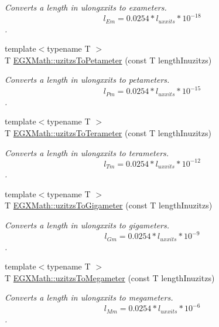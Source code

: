 \begin{DoxyCompactItemize}
\begin{DoxyCompactList}\small\item\em Converts a length in ulongxxits to exameters. \[ l_{Em}=0.0254 * l_{uxxits} * 10^{-18} \]. \end{DoxyCompactList}\item 
{\footnotesize template$<$typename T $>$ }\\T \mbox{\hyperlink{group___e_g_x_math-_conversions-_length_conversions-_imperial-uzitzs-_s_i_gafe93d0226789fd78c2ffa4223eb6af7b}{E\+G\+X\+Math\+::uzitzs\+To\+Petameter}} (const T length\+Inuzitzs)
\begin{DoxyCompactList}\small\item\em Converts a length in ulongxxits to petameters. \[ l_{Pm}=0.0254 * l_{uxxits} * 10^{-15} \]. \end{DoxyCompactList}\item 
{\footnotesize template$<$typename T $>$ }\\T \mbox{\hyperlink{group___e_g_x_math-_conversions-_length_conversions-_imperial-uzitzs-_s_i_gaed1a457a06ea3b69a4c63414b08b03a3}{E\+G\+X\+Math\+::uzitzs\+To\+Terameter}} (const T length\+Inuzitzs)
\begin{DoxyCompactList}\small\item\em Converts a length in ulongxxits to terameters. \[ l_{Tm}=0.0254 * l_{uxxits} * 10^{-12} \]. \end{DoxyCompactList}\item 
{\footnotesize template$<$typename T $>$ }\\T \mbox{\hyperlink{group___e_g_x_math-_conversions-_length_conversions-_imperial-uzitzs-_s_i_ga15833fbe62cb7d741b808bc63a21df55}{E\+G\+X\+Math\+::uzitzs\+To\+Gigameter}} (const T length\+Inuzitzs)
\begin{DoxyCompactList}\small\item\em Converts a length in ulongxxits to gigameters. \[ l_{Gm}=0.0254 * l_{uxxits} * 10^{-9} \]. \end{DoxyCompactList}\item 
{\footnotesize template$<$typename T $>$ }\\T \mbox{\hyperlink{group___e_g_x_math-_conversions-_length_conversions-_imperial-uzitzs-_s_i_ga237ffeef9137de3dd2cf5ae0eacf973e}{E\+G\+X\+Math\+::uzitzs\+To\+Megameter}} (const T length\+Inuzitzs)
\begin{DoxyCompactList}\small\item\em Converts a length in ulongxxits to megameters. \[ l_{Mm}=0.0254 * l_{uxxits} * 10^{-6} \]. \end{DoxyCompactList}\item 

\end{DoxyCompactItemize}
